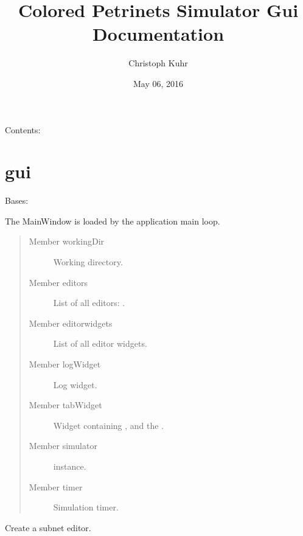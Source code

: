 \documentclass[a4paper,10pt,english]{sphinxmanual}
\title{Colored Petrinets Simulator Gui Documentation}
\date{May 06, 2016}
\author{Christoph Kuhr}
\begin{document}
\maketitle
\tableofcontents
{}\label{index::doc}


Contents:


\chapter{gui}
\label{gui_link:gui}\label{gui_link:module-gui.MainWindow}\label{gui_link:welcome-to-colored-petrinets-simulator-gui-s-documentation}\label{gui_link::doc}

\begin{fulllineitems}
\label{gui_link:gui.MainWindow.MainWindow}
Bases: 

The MainWindow is loaded by the application main loop.
\begin{quote}\begin{description}
\item[{Member workingDir}] \leavevmode
Working directory.

\item[{Member editors}] \leavevmode
List of all editors: .

\item[{Member editorwidgets}] \leavevmode
List of all editor widgets.

\item[{Member logWidget}] \leavevmode
Log widget.

\item[{Member tabWidget}] \leavevmode
Widget containing , and the .

\item[{Member simulator}] \leavevmode
{} instance.

\item[{Member timer}] \leavevmode
Simulation timer.

\end{description}\end{quote}

\begin{fulllineitems}
\label{gui_link:gui.MainWindow.MainWindow.addSubnetEditor}
Create a subnet editor.


\end{fulllineitems}
\end{fulllineitems}
\end{document}
